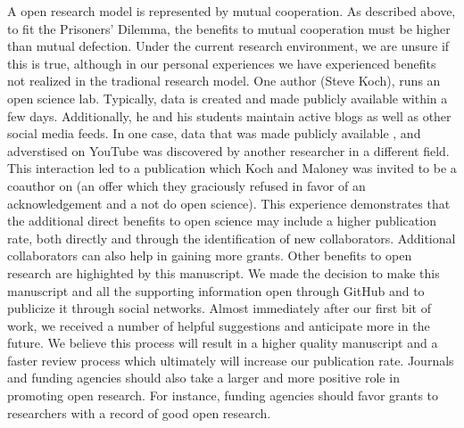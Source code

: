\documentclass[11pt]{article} %
\begin{document}
A open research model is represented by mutual cooperation. As described above, to fit the Prisoners' Dilemma, the benefits to mutual cooperation must be higher than mutual defection. Under the current research environment, we are unsure if this is true, although in our personal experiences we have experienced benefits not realized in the tradional research model. One author (Steve Koch), runs an open science lab. Typically, data is created and made publicly available within a few days. Additionally, he and his students maintain active blogs as well as other social media feeds. In one case, data that was made publicly available , and adverstised on YouTube \cite{koch_kochlab, maloney_koch} was discovered by another researcher in a different field. This interaction led to a publication \cite{deutsch_mechanics_2011} which Koch and Maloney was invited to be a coauthor on (an offer which they graciously refused in favor of an acknowledgement and a not do open science)\cite{koch_steve_2011}. This experience demonstrates that the additional direct benefits to open science may include a higher publication rate, both directly and through the identification of new collaborators. Additional collaborators can also help in gaining more grants. Other benefits to open research are highighted by this manuscript. We made the decision to make this manuscript and all the supporting information open through GitHub\cite{olendorf_gtos_github} and to publicize it through social networks. Almost immediately after our first bit of work, we received a number of helpful suggestions and anticipate more in the future. We believe this process will result in a higher quality manuscript and a faster review process which ultimately will increase our publication rate.  Journals and funding agencies should also take a larger and more positive role in promoting open research. For instance, funding agencies should favor grants to researchers with a record of good open research.
\end{document}
